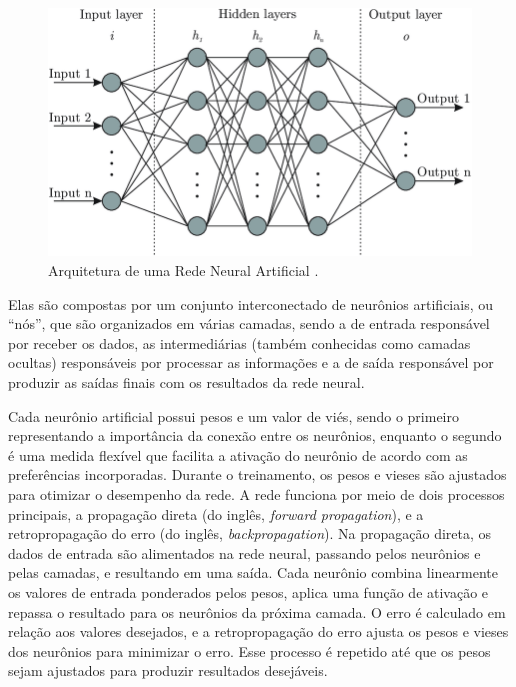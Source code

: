 \begin{figure}[!htbp]
	\centering
	\includegraphics[scale=0.4]{imagens/arch-rede-neural-artificial.png}
    \caption {Arquitetura de uma Rede Neural Artificial \cite{RedeNeuralImagem}.}
\end{figure}


Elas são compostas por um conjunto interconectado de neurônios artificiais, ou ``nós'', que são organizados em várias camadas, sendo a de entrada responsável por receber os dados, as intermediárias (também conhecidas como camadas ocultas) responsáveis por processar as informações e a de saída responsável por produzir as saídas finais com os resultados da rede neural.

Cada neurônio artificial possui pesos e um valor de viés, sendo o primeiro representando a importância da conexão entre os neurônios, enquanto o segundo é uma medida flexível que facilita a ativação do neurônio de acordo com as preferências incorporadas. Durante o treinamento, os pesos e vieses são ajustados para otimizar o desempenho da rede. A rede funciona por meio de dois processos principais, a propagação direta (do inglês, \textit{forward propagation}), e a retropropagação do erro (do inglês, \textit{backpropagation}). Na propagação direta, os dados de entrada são alimentados na rede neural, passando pelos neurônios e pelas camadas, e resultando em uma saída. Cada neurônio combina linearmente os valores de entrada ponderados pelos pesos, aplica uma função de ativação e repassa o resultado para os neurônios da próxima camada. O erro é calculado em relação aos valores desejados, e a retropropagação do erro ajusta os pesos e vieses dos neurônios para minimizar o erro. Esse processo é repetido até que os pesos sejam ajustados para produzir resultados desejáveis.

